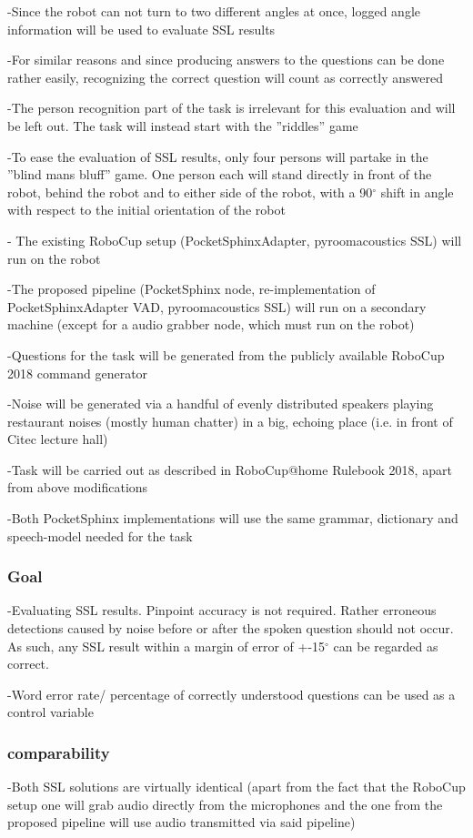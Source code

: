 -Since the robot can not turn to two different angles at once, logged angle information will be used to evaluate SSL results

-For similar reasons and since producing answers to the questions can be done rather easily, recognizing the correct question will count as correctly answered

-The person recognition part of the task is irrelevant for this evaluation and will be left out. The task will instead start with the ''riddles'' game

-To ease the evaluation of SSL results, only four persons will partake in the ''blind mans bluff'' game. One person each will stand directly in front of the robot, behind the robot and to either side of the robot, with a 90$^\circ$ shift in angle with respect to the initial orientation of the robot

- The existing RoboCup setup (PocketSphinxAdapter, pyroomacoustics SSL) will run on the robot

-The proposed pipeline (PocketSphinx node, re-implementation of PocketSphinxAdapter VAD, pyroomacoustics SSL) will run on a secondary machine (except for a audio grabber node, which must run on the robot)

-Questions for the task will be generated from the publicly available RoboCup 2018 command generator

-Noise will be generated via a handful of evenly distributed speakers playing restaurant noises (mostly human chatter) in a big, echoing place (i.e. in front of Citec lecture hall)

-Task will be carried out as described in RoboCup@home Rulebook 2018, apart from above modifications

-Both PocketSphinx implementations will use the same grammar, dictionary and speech-model needed for the task

\subsubsection{Goal}
-Evaluating SSL results. Pinpoint accuracy is not required. Rather erroneous detections caused by noise before or after the spoken question should not occur. As such, any SSL result within a margin of error of +-15$^\circ$  can be regarded as correct. 

-Word error rate/ percentage of correctly understood questions can be used as a control variable 

\subsubsection{comparability}
-Both SSL solutions are virtually identical (apart from the fact that the RoboCup setup one will grab audio directly from the microphones and the one from the proposed pipeline will use audio transmitted via said pipeline)

